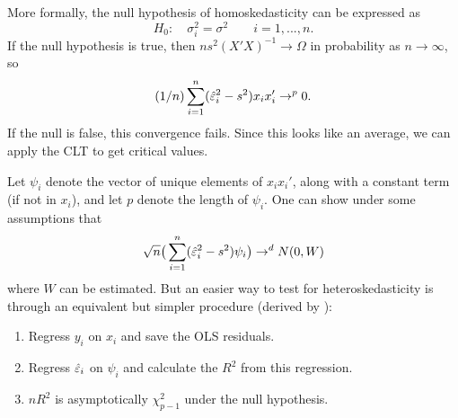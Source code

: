 \begin{itemize}
  More formally, the null hypothesis of homoskedasticity can be
  expressed as
  \begin{equation*}
    H_0: \quad \sigma^2_i = \sigma^2 \qquad i = 1,...,n.
  \end{equation*}
  If the null hypothesis is true, then $n s^2 (X'X)^{-1} \to \Omega$
  in probability as $n \to \infty$,
  so
  \begin{equation*}
    (1/n) \sum_{i=1}^n (\hat{\varepsilon}^2_i - s^2) x_i x_i' \to^p 0.
  \end{equation*}
  If the null is false, this convergence fails.  Since this looks like
  an average, we can apply the CLT to get critical values.

  Let $\psi_i$ denote the vector of unique elements of $x_ix_i'$, along
  with a constant term (if not in $x_i$), and let $p$ denote the
  length of $\psi_i$.  One can show under some assumptions that
  \begin{equation*}
    \sqrt{n} \big( \sum_{i=1}^n (\hat{\varepsilon}^2_i - s^2) \psi_i \big) \to^d N(0, W)
  \end{equation*}
  where $W$ can be estimated.  But an easier way to test for
  heteroskedasticity is through an equivalent but simpler procedure
  (derived by \citealp{Whi80}):
  
  \begin{enumerate}
  \item Regress $y_i$ on $x_i$ and save the OLS residuals.
  \item Regress $\hat{\varepsilon}_i$ on $\psi_i$ and calculate the $R^2$
    from this regression.
  \item $n R^2$ is asymptotically $\chi^2_{p-1}$ under the null
    hypothesis.
  \end{enumerate}

\end{itemize}

